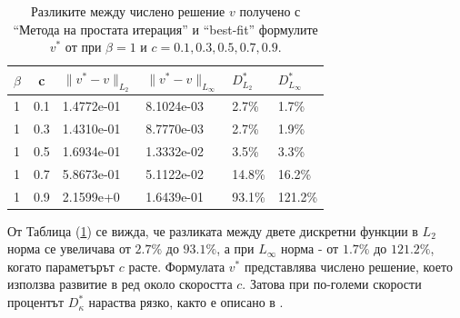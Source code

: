\documentclass{article}
\newcommand{\rf}[1]{(\ref{#1})}
\begin{document}
\begin{table}[ht]
\centering
\begin{tabular}{|l|c|l l|l l|}
\hline 
\hline 
$\beta$	& c 	& $\|v^*-v \|_{L_2 }$ & $\|v^*-v \|_{L_\infty }$  	& $D^*_{L_2}$	& $D^*_{L_\infty }$	\\
\hline 
1& 		0.1	&	1.4772e-01 		& 	8.1024e-03 				& 2.7\%			& 1.7\%		\\
\hline 
1& 		0.3 	&	1.4310e-01 		& 	8.7770e-03				& 2.7\%			& 1.9\%		\\
\hline 
1& 		0.5 	&	1.6934e-01 		& 	1.3332e-02				& 3.5\%			& 3.3\%		\\
\hline 
1& 		0.7 	&	5.8673e-01		& 	5.1122e-02				& 14.8\%		& 16.2\%	\\
\hline 
1& 		0.9	&	2.1599e+0 		& 	1.6439e-01				& 93.1\%		& 121.2\%	\\
\hline 
\hline 
\end{tabular}
\caption{Разликите между числено решение $v$ получено с ``Метода на простата итерация'' и ``best-fit'' формулите $v^*$ от \cite{Ch2011} при $\beta=1$ и $c=0.1, 0.3, 0.5, 0.7, 0.9$.}
\label{tab:diff-beta1}
\end{table}
От Таблица \rf{tab:diff-beta1} се вижда, че разликата между двете дискретни функции в $L_2$ норма се увеличава от $2.7\%$ до $93.1\%$, а при $L_\infty$ норма - от $1.7\%$ до $121.2\%$, когато параметърът $c$ расте. Формулата $v^*$ представлява числено решение, което използва развитие в ред около скоростта $c$. Затова при по-големи скорости процентът $D^*_{\kappa}$ нараства рязко, както е описано в \cite{Ch2011}.

\end{document}
